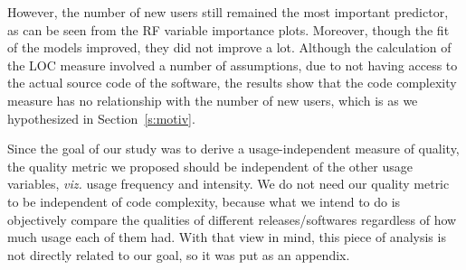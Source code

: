 \documentclass[smallcondensed]{svjour3}     %
\begin{document}
However, the number of new users still remained the most important predictor, as can be seen from the RF variable importance plots. Moreover, though the fit of the models improved, they did not improve a lot. Although the calculation of the LOC measure involved a number of assumptions, due to not having access to the actual source code of the software, the results show that the code complexity measure has no relationship with the number of new users, which is as we hypothesized in Section~\ref{s:motiv}. 

Since the goal of our study was to derive a usage-independent measure of quality, the quality metric we proposed should be independent of the other usage variables, \emph{viz.} usage frequency and intensity. We do not need our quality metric to be independent of code complexity, because what we intend to do is objectively compare the qualities of different releases/softwares regardless of how much usage each of them had. With that view in mind, this piece of analysis is not directly related to our goal, so it was put as an appendix.
\end{document}
